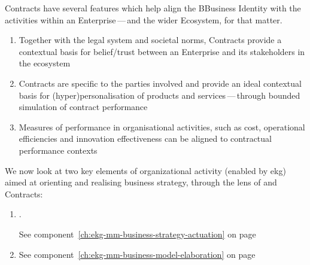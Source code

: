 Contracts have several features which help align the BBusiness Identity with the activities
within an Enterprise\,---\,and the wider Ecosystem, for that matter.

\begin{enumerate}[label=\alph*]
    \item Together with the legal system and societal norms, Contracts provide a contextual basis for
          belief/trust between an Enterprise and its stakeholders in the ecosystem
    \item Contracts are specific to the parties involved and provide an ideal contextual basis for
          (hyper)personalisation of products and services\,---\,through bounded simulation of contract performance
    \item Measures of performance in organisational activities, such as cost, operational efficiencies and
          innovation effectiveness can be aligned to contractual performance contexts
\end{enumerate}

We now look at two key elements of organizational activity (enabled by \gls{ekg}) aimed at orienting and
realising business strategy, through the lens of 
and Contracts:

\begin{enumerate}
    \item .

    See component~\ref{ch:ekg-mm-business-strategy-actuation} 
    on page \pageref{ch:ekg-mm-business-strategy-actuation}

    \item 

    See component~\ref{ch:ekg-mm-business-model-elaboration} 
    on page \pageref{ch:ekg-mm-business-model-elaboration}
\end{enumerate}

